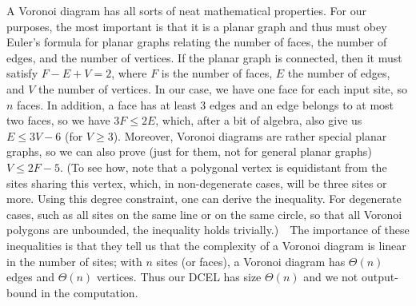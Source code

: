 \documentclass[11pt]{article}
\begin{document}
A Voronoi diagram has all sorts of neat mathematical properties.  For our
purposes, the most important is that it is a planar graph and thus must
obey Euler's formula for planar graphs relating the number of faces,
the number of edges, and the number of vertices.  If the planar
graph is connected, then it must satisfy $F-E+V=2$, where $F$ is the number
of faces, $E$ the number of edges, and $V$ the number of vertices.
In our case, we have one face for each input site, so $n$ faces.
In addition, a face has at least 3 edges and an edge belongs to at most
two faces, so we have $3F\leq 2E$, which, after a bit of algebra,
also give us $E\leq 3V-6$ (for $V\geq 3$).  Moreover, Voronoi diagrams
are rather special planar graphs, so we can also prove (just for them,
not for general planar graphs) $V\leq 2F-5$.   (To see how, note that a
polygonal vertex is equidistant from the sites sharing this vertex, which,
in non-degenerate cases, will be three sites or more.  Using this degree
constraint, one can derive the inequality.  For degenerate cases,
such as all sites on the same line or on the same circle, so that
all Voronoi polygons are unbounded, the inequality holds trivially.)\ \ 
The importance of these inequalities is that they tell us that the complexity
of a Voronoi diagram is linear in the number of sites; with $n$ sites (or
faces), a Voronoi diagram has $\Theta(n)$ edges and $\Theta(n)$ vertices.
Thus our DCEL has size $\Theta(n)$ and we not output-bound in the computation.
\end{document}
